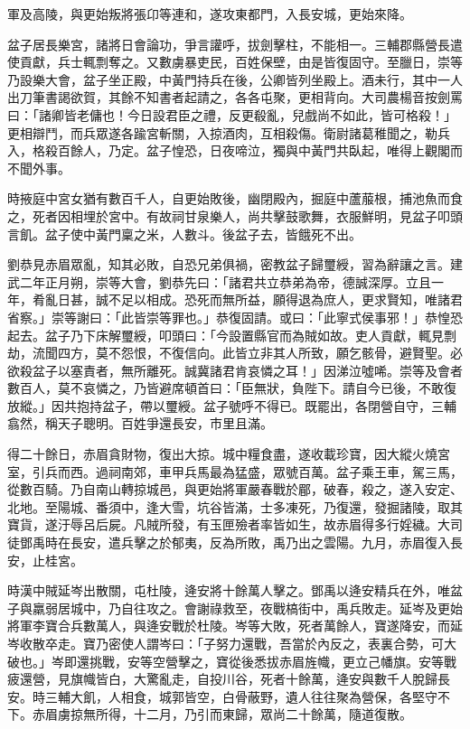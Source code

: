 \begin{pinyinscope}
軍及高陵，與更始叛將張卬等連和，遂攻東都門，入長安城，更始來降。

盆子居長樂宮，諸將日會論功，爭言讙呼，拔劍擊柱，不能相一。三輔郡縣營長遣使貢獻，兵士輒剽奪之。又數虜暴吏民，百姓保壁，由是皆復固守。至臘日，崇等乃設樂大會，盆子坐正殿，中黃門持兵在後，公卿皆列坐殿上。酒未行，其中一人出刀筆書謁欲賀，其餘不知書者起請之，各各屯聚，更相背向。大司農楊音按劍罵曰：「諸卿皆老傭也！今日設君臣之禮，反更殽亂，兒戲尚不如此，皆可格殺！」更相辯鬥，而兵眾遂各踰宮斬關，入掠酒肉，互相殺傷。衛尉諸葛稚聞之，勒兵入，格殺百餘人，乃定。盆子惶恐，日夜啼泣，獨與中黃門共臥起，唯得上觀閣而不聞外事。

時掖庭中宮女猶有數百千人，自更始敗後，幽閉殿內，掘庭中蘆菔根，捕池魚而食之，死者因相埋於宮中。有故祠甘泉樂人，尚共擊鼓歌舞，衣服鮮明，見盆子叩頭言飢。盆子使中黃門稟之米，人數斗。後盆子去，皆餓死不出。

劉恭見赤眉眾亂，知其必敗，自恐兄弟俱禍，密教盆子歸璽綬，習為辭讓之言。建武二年正月朔，崇等大會，劉恭先曰：「諸君共立恭弟為帝，德誠深厚。立且一年，肴亂日甚，誠不足以相成。恐死而無所益，願得退為庶人，更求賢知，唯諸君省察。」崇等謝曰：「此皆崇等罪也。」恭復固請。或曰：「此寧式侯事邪！」恭惶恐起去。盆子乃下床解璽綬，叩頭曰：「今設置縣官而為賊如故。吏人貢獻，輒見剽劫，流聞四方，莫不怨恨，不復信向。此皆立非其人所致，願乞骸骨，避賢聖。必欲殺盆子以塞責者，無所離死。誠冀諸君肯哀憐之耳！」因涕泣噓唏。崇等及會者數百人，莫不哀憐之，乃皆避席頓首曰：「臣無狀，負陛下。請自今已後，不敢復放縱。」因共抱持盆子，帶以璽綬。盆子號呼不得已。既罷出，各閉營自守，三輔翕然，稱天子聰明。百姓爭還長安，市里且滿。

得二十餘日，赤眉貪財物，復出大掠。城中糧食盡，遂收載珍寶，因大縱火燒宮室，引兵而西。過祠南郊，車甲兵馬最為猛盛，眾號百萬。盆子乘王車，駕三馬，從數百騎。乃自南山轉掠城邑，與更始將軍嚴春戰於郿，破春，殺之，遂入安定、北地。至陽城、番須中，逢大雪，坑谷皆滿，士多凍死，乃復還，發掘諸陵，取其寶貨，遂汙辱呂后屍。凡賊所發，有玉匣殮者率皆如生，故赤眉得多行婬穢。大司徒鄧禹時在長安，遣兵擊之於郁夷，反為所敗，禹乃出之雲陽。九月，赤眉復入長安，止桂宮。

時漢中賊延岑出散關，屯杜陵，逄安將十餘萬人擊之。鄧禹以逄安精兵在外，唯盆子與羸弱居城中，乃自往攻之。會謝祿救至，夜戰槁街中，禹兵敗走。延岑及更始將軍李寶合兵數萬人，與逄安戰於杜陵。岑等大敗，死者萬餘人，寶遂降安，而延岑收散卒走。寶乃密使人謂岑曰：「子努力還戰，吾當於內反之，表裏合勢，可大破也。」岑即還挑戰，安等空營擊之，寶從後悉拔赤眉旌幟，更立己幡旗。安等戰疲還營，見旗幟皆白，大驚亂走，自投川谷，死者十餘萬，逄安與數千人脫歸長安。時三輔大飢，人相食，城郭皆空，白骨蔽野，遺人往往聚為營保，各堅守不下。赤眉虜掠無所得，十二月，乃引而東歸，眾尚二十餘萬，隨道復散。


\end{pinyinscope}
